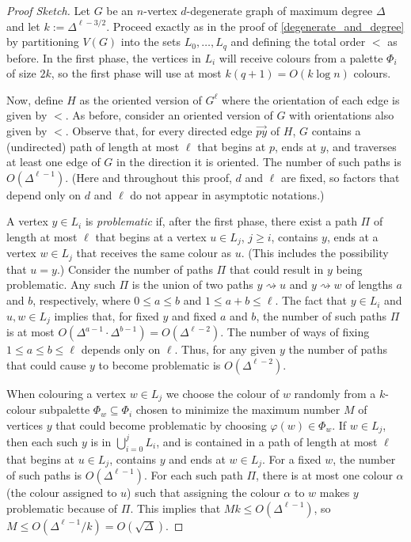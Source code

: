 \documentclass{patmorin}
\newcommand{\defin}[1]{\emph{\color{brightmaroon}#1}}
\begin{document}
\begin{proof}[Proof Sketch]
  Let $G$ be an $n$-vertex $d$-degenerate graph of maximum degree $\Delta$ and let $k:=\Delta^{\ell-3/2}$. Proceed exactly as in the proof of \cref{degenerate_and_degree} by partitioning $V(G)$ into the sets $L_0,\ldots,L_q$ and defining the total order $<$ as before.  In the first phase, the vertices in $L_i$ will receive colours from a palette $\Phi_i$ of size $2k$, so the first phase will use at most $k(q+1)=O(k\log n)$ colours.

  Now, define $H$ as the oriented version of $G^{\ell}$ where the orientation of each edge is given by $<$.  As before, consider an oriented version of $G$ with orientations also given by $<$.  Observe that, for every directed edge $\overrightarrow{py}$ of $H$, $G$ contains a (undirected) path of length at most $\ell$ that begins at $p$, ends at $y$, and traverses at least one edge of $G$ in the direction it is oriented.  The number of such paths is $O(\Delta^{\ell-1})$.  (Here and throughout this proof, $d$ and $\ell$ are fixed, so factors that depend only on $d$ and $\ell$ do not appear in asymptotic notations.)

  A vertex $y\in L_i$ is \defin{problematic} if, after the first phase, there exist a path $\Pi$ of length at most $\ell$ that begins at a vertex $u\in L_j$, $j\ge i$, contains $y$, ends at a vertex $w\in L_j$ that receives the same colour as $u$.  (This includes the possibility that $u=y$.)  Consider the number of paths $\Pi$ that could result in $y$ being problematic. Any such $\Pi$ is the union of two paths $y\rightsquigarrow u$ and $y\rightsquigarrow w$ of lengths $a$ and $b$, respectively, where $0\le a\le b$ and $1\le a+b\le\ell$. The fact that $y\in L_i$ and $u,w\in L_j$ implies that, for fixed $y$ and fixed $a$ and $b$, the number of such paths $\Pi$ is at most $O(\Delta^{a-1}\cdot\Delta^{b-1})=O(\Delta^{\ell-2})$. The number of ways of fixing $1\le a\le b\le \ell$ depends only on $\ell$.  Thus, for any given $y$ the number of paths that could cause $y$ to become problematic is $O(\Delta^{\ell-2})$.

  When colouring a vertex $w\in L_j$ we choose the colour of $w$ randomly from a $k$-colour subpalette $\Phi_w\subseteq \Phi_i$ chosen to minimize the maximum number $M$ of vertices $y$ that could become problematic by choosing $\varphi(w)\in \Phi_w$.  If $w\in L_j$, then each such $y$ is in $\bigcup_{i=0}^{j} L_i$, and is contained in a path of length at most $\ell$ that begins at $u\in L_j$, contains $y$ and ends at $w\in L_j$.  For a fixed $w$, the number of such paths is $O(\Delta^{\ell-1})$. For each such path $\Pi$, there is at most one colour $\alpha$ (the colour assigned to $u$) such that assigning the colour $\alpha$ to $w$ makes $y$ problematic because of $\Pi$.  This implies that $Mk \le O(\Delta^{\ell-1})$, so $M\le O(\Delta^{\ell-1}/k)=O(\sqrt{\Delta})$.


\end{proof}
\end{document}
